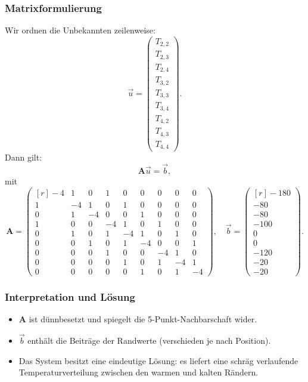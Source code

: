 \subsubsection*{Matrixformulierung}
Wir ordnen die Unbekannten zeilenweise:
\[
\vec{u} =
\begin{pmatrix}
	T_{2,2}\\T_{2,3}\\T_{2,4}\\
	T_{3,2}\\T_{3,3}\\T_{3,4}\\
	T_{4,2}\\T_{4,3}\\T_{4,4}
\end{pmatrix}.
\]
Dann gilt:
\[
\boldsymbol{A}\vec{u}=\vec{b},
\]
mit
\[
\boldsymbol{A}=
\begin{pmatrix*}[r]
	-4& 1& 0& 1& 0& 0& 0& 0& 0\\
	1&-4& 1& 0& 1& 0& 0& 0& 0\\
	0& 1&-4& 0& 0& 1& 0& 0& 0\\
	1& 0& 0&-4& 1& 0& 1& 0& 0\\
	0& 1& 0& 1&-4& 1& 0& 1& 0\\
	0& 0& 1& 0& 1&-4& 0& 0& 1\\
	0& 0& 0& 1& 0& 0&-4& 1& 0\\
	0& 0& 0& 0& 1& 0& 1&-4& 1\\
	0& 0& 0& 0& 0& 1& 0& 1&-4
\end{pmatrix*},
\quad
\vec{b}=
\begin{pmatrix*}[r]
	-180\\-80\\-80\\
	-100\\0\\0\\
	-120\\-20\\-20
\end{pmatrix*}.
\]

\subsubsection*{Interpretation und Lösung}
\begin{itemize}
	\item $\boldsymbol{A}$ ist dünnbesetzt und spiegelt die 5-Punkt-Nachbarschaft wider.
	\item $\vec{b}$ enthält die Beiträge der Randwerte (verschieden je nach Position).
	\item Das System besitzt eine eindeutige Lösung: es liefert eine schräg verlaufende Temperaturverteilung zwischen den warmen und kalten Rändern.
\end{itemize}


